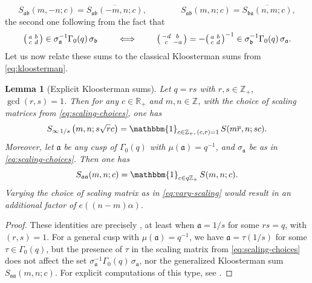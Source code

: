 \documentclass[reqno,11pt]{amsart}
\newtheorem{knownlemma}[knowntheorem]{Lemma}
\theoremstyle{remark}
\numberwithin{equation}{section}
\newcommand{\Z}{\mathbb{Z}}
\newcommand{\R}{\mathbb{R}}
\newcommand{\ma}{\mathfrak{a}}
\newcommand{\mb}{\mathfrak{b}}
\newcommand{\one}{\mathbbm{1}}
\renewcommand{\bar}{\overline}
\newenvironment{psmall}
  {\left(\begin{smallmatrix}}
  {\end{smallmatrix}\right)}
\begin{document}
\begin{equation} \label{eq:kloosterman-symmetries}
    S_{\ma\mb}(m, -n; c) = \bar{S_{\ma\mb}(-m, n; c)},
    \qquad\qquad 
    S_{\ma\mb}(m, n; c) = \bar{S_{\mb\ma}(n, m; c)},
\end{equation}
the second one following from the fact that
\[
    \begin{psmall}
    a & b \\ 
    c & d
    \end{psmall}
    \in \sigma_{\ma}^{-1} \Gamma_0(q)\, \sigma_{\mb}
    \qquad 
    \iff 
    \qquad
    \begin{psmall}
    -d & b \\ 
    c & -a
    \end{psmall}
    =
    - 
    \begin{psmall}
    a & b \\ 
    c & d
    \end{psmall}^{-1}
    \in \sigma_{\mb}^{-1} \Gamma_0(q)\, \sigma_{\ma}.
\]
Let us now relate these sums to the classical Kloosterman sums from \cref{eq:kloosterman}.

\begin{knownlemma}[Explicit Kloosterman sums] \label{lem:explicit-kloosterman}
Let $q = rs$ with $r, s \in \Z_+$, $\gcd(r, s) = 1$.  Then for any $c \in \R_+$ and $m, n \in \Z$, with the choice of scaling matrices from \cref{eq:scaling-choices}, one has
\begin{equation} \label{eq:explicit-kl-diff}
    S_{\infty\,1/s}\left(m, n; s \sqrt{r} c\right) = \one_{c \in \Z_+,\, (c, r) = 1}\, S(m \bar{r}, n; sc).
\end{equation}
Moreover, let $\ma$ be any cusp of $\Gamma_0(q)$ with $\mu(\ma) = q^{-1}$, and $\sigma_{\ma}$ be as in \cref{eq:scaling-choices}. Then one has
\begin{equation} \label{eq:explicit-kl-same}
    S_{\ma \ma}(m, n; c) = \one_{c \in q\Z_+}\, S(m, n; c).
\end{equation}
Varying the choice of scaling matrix as in \cref{eq:vary-scaling} would result in an additional factor of $e((n-m)\alpha)$.
\end{knownlemma}
\begin{proof}
These identities are precisely \cite[(3.5) and (3.4)]{watt1995kloosterman}, at least when $\ma = 1/s$ for some $rs = q$, with $(r, s) = 1$. For a general cusp with $\mu(\ma) = q^{-1}$, we have $\ma = \tau(1/s)$ for some $\tau \in \Gamma_0(q)$, but the presence of $\tau$ in the scaling matrix from \cref{eq:scaling-choices} does not affect the set $\sigma_{\ma}^{-1} \Gamma_0(q)\, \sigma_{\ma}$, nor the generalized Kloosterman sum $S_{\ma\ma}(m, n; c)$. For explicit computations of this type, see \cite[\S 2]{deshouillers1982kloosterman}.
\end{proof}
\end{document}
